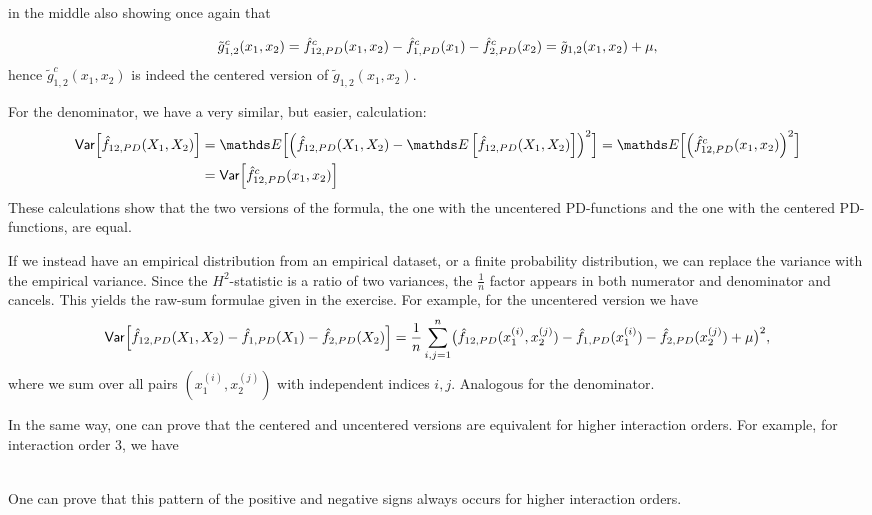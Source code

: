{\begin{enumerate}[a)]
in the middle also showing once again that

$$
\tilde{g}^c_{1,2}(x_1, x_2)
= \hat{f}^c_{12,PD}(x_1, x_2) - \hat{f}^c_{1,PD}(x_1) - \hat{f}^c_{2,PD}(x_2)
= \tilde{g}_{1,2}(x_1, x_2) + \mu,
$$
hence $\tilde{g}^c_{1,2}(x_1, x_2)$ is indeed the centered version of $\tilde{g}_{1,2}(x_1, x_2)$.

For the denominator, we have a very similar, but easier, calculation:
\begin{align*}
\var \Bigl[
    \fh_{12,PD}(X_1, X_2)
    \Bigr] 
= & \; \E \Bigl[ \left( \fh_{12,PD}(X_1, X_2) - \E \left[ \fh_{12,PD}(X_1, X_2) \right] \right)^2 \Bigr]
= \E \Bigl[ \left( \fh^c_{12,PD}(x_1, x_2) \right)^2 \Bigr] \\
= & \; \var \Bigl[ \fh^c_{12,PD}(x_1, x_2) \Bigr]
\end{align*}
These calculations show that the two versions of the formula, the one with the uncentered PD-functions and the one with the centered PD-functions, are equal.

If we instead have an empirical distribution from an empirical dataset, or a finite probability distribution, we can replace the variance with the empirical variance. Since the $H^2$-statistic is a ratio of two variances, the $\tfrac{1}{n}$ factor appears in both numerator and denominator and cancels. This yields the raw-sum formulae given in the exercise.
For example, for the uncentered version we have
\[
\mathsf{Var} \Bigl[ \hat{f}_{12,PD}(X_1, X_2) - \hat{f}_{1,PD}(X_1) - \hat{f}_{2,PD}(X_2) \Bigr]
= \frac{1}{n} \sum_{i,j = 1}^n \bigl(
    \hat{f}_{12,PD}(x_1^{(i)},x_2^{(j)})-
    \hat{f}_{1,PD}(x_1^{(i)})-
    \hat{f}_{2,PD}(x_2^{(j)})
    + \mu
\bigr)^2,
\]
where we sum over all pairs $(x_1^{(i)}, x_2^{(j)})$ with independent indices $i,j$. Analogous for the denominator.

In the same way, one can prove that the centered and uncentered versions are equivalent for higher interaction orders.
For example, for interaction order 3, we have

\begin{align*}
\end{align*}

One can prove that this pattern of the positive and negative signs always occurs for higher interaction orders.

\end{enumerate}

}